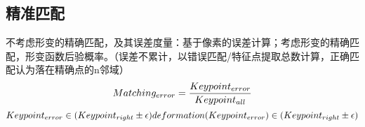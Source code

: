 \subsection{精准匹配}

不考虑形变的精确匹配，及其误差度量：基于像素的误差计算；考虑形变的精确匹配，形变函数后验概率。（误差不累计，以错误匹配/特征点提取总数计算，正确匹配认为落在精确点的n邻域）
\begin{equation}
    Matching_{error} = \frac{Keypoint_{error}}{Keypoint_{all}} 
    \label{equ:Matching_{error}}
\end{equation}
\begin{equation}
    Keypoint_{error} \in (Keypoint_{right}  \pm \epsilon) \\ 
    deformation(Keypoint_{error}) \in (Keypoint_{right}  \pm \epsilon)
    \label{equ:keypoint_{error}}
\end{equation}